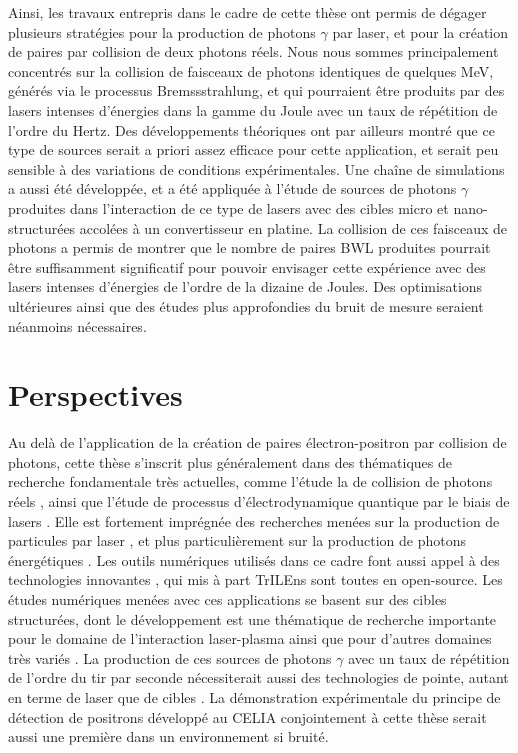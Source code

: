 \begin{refsection}
Ainsi, les travaux entrepris dans le cadre de cette thèse ont permis de dégager plusieurs stratégies pour la production de photons $\gamma$ par laser, et pour la création de paires par collision de deux photons réels. Nous nous sommes principalement concentrés sur la collision de faisceaux de photons identiques de quelques MeV, générés via le processus Bremssstrahlung, et qui pourraient être produits par des lasers intenses d'énergies dans la gamme du Joule avec un taux de répétition de l'ordre du Hertz. Des développements théoriques ont par ailleurs montré que ce type de sources serait a priori assez efficace pour cette application, et serait peu sensible à des variations de conditions expérimentales. Une chaîne de simulations a aussi été développée, et a été appliquée à l'étude de sources de photons $\gamma$ produites dans l'interaction de ce type de lasers avec des cibles micro et nano-structurées accolées à un convertisseur en platine. La collision de ces faisceaux de photons a permis de montrer que le nombre de paires BWL produites pourrait être suffisamment significatif pour pouvoir envisager cette expérience avec des lasers intenses d'énergies de l'ordre de la dizaine de Joules. Des optimisations ultérieures ainsi que des études plus approfondies du bruit de mesure seraient néanmoins nécessaires.


\section{Perspectives}

Au delà de l'application de la création de paires électron-positron par collision de photons, cette thèse s'inscrit plus généralement dans des thématiques de recherche fondamentale très actuelles, comme l'étude la de collision de photons réels \parencite{marklund_2006, chou_2018, takahashi_2019}, ainsi que l'étude de processus d'électrodynamique quantique par le biais de lasers \parencite{dipiazza_2012, zhang_2020}. 
Elle est fortement imprégnée des recherches menées sur la production de particules par laser \parencite{ledingham_2010}, et plus particulièrement sur la production de photons énergétiques \parencite{albert_2016, corde_2013a}.
Les outils numériques utilisés dans ce cadre font aussi appel à des technologies innovantes \parencite{derouillat_2018, agostinelli_2003, jansen_2018, gp3m2, p2sat, fryxell_2000}, qui mis à part TrILEns sont toutes en open-source. 
Les études numériques menées avec ces applications se basent sur des cibles structurées, dont le développement est une thématique de recherche importante pour le domaine de l'interaction laser-plasma \parencite{passoni_2020, prencipe_2017} ainsi que pour d'autres domaines très variés \parencite{kuchibhatla_2007}. 
La production de ces sources de photons $\gamma$ avec un taux de répétition de l'ordre du tir par seconde nécessiterait aussi des technologies de pointe, autant en terme de laser \parencite{danson_2019} que de cibles \parencite{prencipe_2017}. 
La démonstration expérimentale du principe de détection de positrons développé au CELIA conjointement à cette thèse serait aussi une première dans un environnement si bruité.


\end{refsection}
